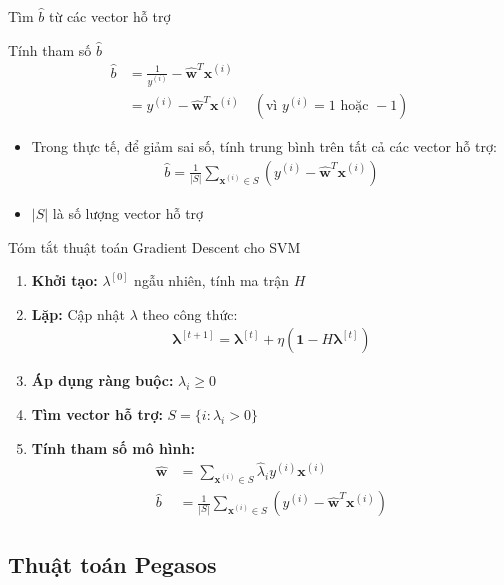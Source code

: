 \documentclass[serif, aspectratio=169]{beamer}
\begin{document}
	\begin{frame}{Tìm $\hat{b}$ từ các vector hỗ trợ}
		\begin{block}{Tính tham số $\hat{b}$}
			\begin{align*}
				\hat{b} &= \frac{1}{y^{(i)}} - \hat{\mathbf{w}}^T \mathbf{x}^{(i)} \\
				&= y^{(i)} - \hat{\mathbf{w}}^T \mathbf{x}^{(i)} \quad (\text{vì } y^{(i)} = 1 \text{ hoặc } -1)
			\end{align*}
		\end{block}
		\begin{itemize}
			\item Trong thực tế, để giảm sai số, tính trung bình trên tất cả các vector hỗ trợ:
			\begin{align*}
				\hat{b} = \frac{1}{|S|} \sum_{\mathbf{x}^{(i)} \in S} (y^{(i)} - \hat{\mathbf{w}}^T \mathbf{x}^{(i)})
			\end{align*}
			\item $|S|$ là số lượng vector hỗ trợ
		\end{itemize}
	\end{frame}
	
	\begin{frame}{Tóm tắt thuật toán Gradient Descent cho SVM}
		\begin{enumerate}
			\item \textbf{Khởi tạo:} $\lambda^{[0]}$ ngẫu nhiên, tính ma trận $H$
			\item \textbf{Lặp:} Cập nhật $\lambda$ theo công thức:
			\begin{align*}
				\bm{\lambda}^{[t+1]} = \bm{\lambda}^{[t]} + \eta(\mathbf{1} - H\bm{\lambda}^{[t]})
			\end{align*}
			\item \textbf{Áp dụng ràng buộc:} $\lambda_i \geq 0$
			\item \textbf{Tìm vector hỗ trợ:} $S = \{i : \lambda_i > 0\}$
			\item \textbf{Tính tham số mô hình:}
			\begin{align*}
				\hat{\mathbf{w}} &= \sum_{\mathbf{x}^{(i)} \in S} \hat{\lambda}_i y^{(i)} \mathbf{x}^{(i)} \\
				\hat{b} &= \frac{1}{|S|} \sum_{\mathbf{x}^{(i)} \in S} (y^{(i)} - \hat{\mathbf{w}}^T \mathbf{x}^{(i)})
			\end{align*}
		\end{enumerate}
	\end{frame}
	
	\subsection{Thuật toán Pegasos}
\end{document}
